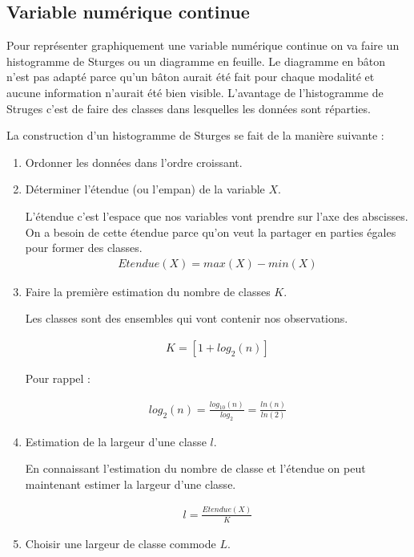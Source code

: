 \documentclass{report}
\begin{document}
\subsection{Variable numérique continue}

Pour représenter graphiquement une variable numérique continue on va faire un histogramme de Sturges ou un diagramme en feuille. Le diagramme en bâton n'est pas adapté parce qu'un bâton aurait été fait pour chaque modalité et aucune information n'aurait été bien visible. L'avantage de l'histogramme de Struges c'est de faire des classes dans lesquelles les données sont réparties.

La construction d'un histogramme de Sturges se fait de la manière suivante :

\begin{enumerate}
  \item Ordonner les données dans l'ordre croissant.
  \item Déterminer l'étendue (ou l'empan) de la variable $X$.
  
   L'étendue c'est l'espace que nos variables vont prendre sur l'axe des abscisses. On a besoin de cette étendue parce qu'on veut la partager en parties égales pour former des classes.
  \begin{align*}
  Etendue(X) = max(X) - min(X)
  \end{align*} 
  \quad
  \item Faire la première estimation du nombre de classes $K$.
  
  Les classes sont des ensembles qui vont contenir nos observations.

  \begin{align*}
  K = [1+log_2(n)]
  \end{align*} 

Pour rappel : 

  \begin{align*}
  log_2(n) = \frac{log_{10}(n)}{log_2} = \frac{ln(n)}{ln(2)} 
  \end{align*} 
  
  \item Estimation de la largeur d'une classe $l$.

  En connaissant l'estimation du nombre de classe et l'étendue on peut maintenant estimer la largeur d'une classe.
  
  \begin{align*}
  l = \frac{Etendue(X)}{K}
  \end{align*}

  \item Choisir une largeur de classe commode $L$.
  

\end{enumerate}
\end{document}
